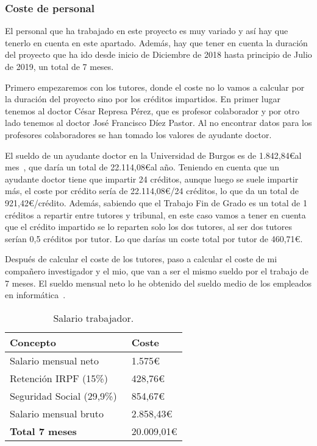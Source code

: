 \subsubsection{Coste de personal}
El personal que ha trabajado en este proyecto es muy variado y así hay que tenerlo en cuenta en este apartado. Además, hay que tener en cuenta la duración del proyecto que ha ido desde inicio de Diciembre de 2018 hasta principio de Julio de 2019, un total de 7 meses.

Primero empezaremos con los tutores, donde el coste no lo vamos a calcular por la duración del proyecto sino por los créditos impartidos. En primer lugar tenemos al doctor César Represa Pérez, que es profesor colaborador y por otro lado tenemos al doctor José Francisco Díez Pastor. Al no encontrar datos para los profesores colaboradores se han tomado los valores de ayudante doctor.

El sueldo de un ayudante doctor en la Universidad de Burgos es de 1.842,84\euro al mes~\cite{sueldos}, que daría un total de 22.114,08\euro al año. Teniendo en cuenta que un ayudante doctor tiene que impartir 24 créditos, aunque luego se suele impartir más, el coste por crédito sería de 22.114,08\euro/24 créditos, lo que da un total de 921,42\euro/crédito. Además, sabiendo que el Trabajo Fin de Grado es un total de 1 créditos a repartir entre tutores y tribunal, en este caso vamos a tener en cuenta que el crédito impartido se lo reparten solo los dos tutores, al ser dos tutores serían 0,5 créditos por tutor. Lo que darías un coste total por tutor de 460,71\euro.

Después de calcular el coste de los tutores, paso a calcular el coste de mi compañero investigador y el mio, que van a ser el mismo sueldo por el trabajo de 7 meses. El sueldo mensual neto lo he obtenido del sueldo medio de los empleados en informática~\cite{salario}.

\begin{table}[H]
	\centering
	\begin{tabular}{ll}
		\toprule
		\textbf{Concepto}         & \textbf{Coste}                \\
		\midrule
		Salario mensual neto      & 1.575\euro     \\
		Retención IRPF (15\%)     & 428,76\euro   \\
		Seguridad Social (29,9\%)~\cite{gobees} & 854,67\euro   \\
		Salario mensual bruto     & 2.858,43\euro  \\
		\midrule
		\textbf{Total 7 meses}    & 20.009,01\euro \\		
		\bottomrule
	\end{tabular}
	\caption{Salario trabajador.}
\end{table}

